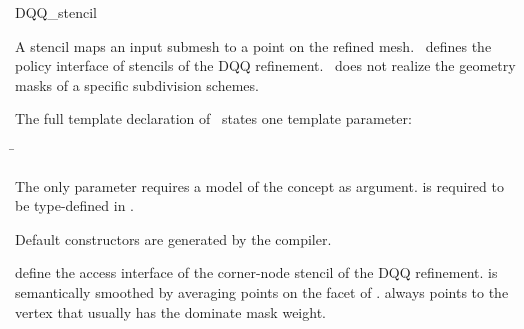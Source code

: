\begin{ccRefClass}{DQQ_stencil}

\ccDefinition

A stencil maps an input submesh to a point on the refined 
mesh. \ccClassTemplateName\ defines the policy interface of 
stencils of the DQQ refinement. \ccClassTemplateName\ does not
realize the geometry masks of a specific subdivision schemes.


\ccParameters

The full template declaration of \ccClassTemplateName\ states one
template parameter:

\begin{tabbing}
 \= 
\end{tabbing}
   
The only parameter requires a model of 
the  concept as argument.  
is required to be type-defined in .

\ccCreation

Default constructors are generated by the compiler.


\ccThree{}{}{}

{define the access interface of the corner-node stencil 
of the DQQ refinement. 
 is semantically smoothed by averaging points on 
the facet of .  always points to the vertex 
that usually has the dominate mask weight.}

\ccSeeAlso

\\
\\
\\

\end{ccRefClass}

\ccRefPageEnd



